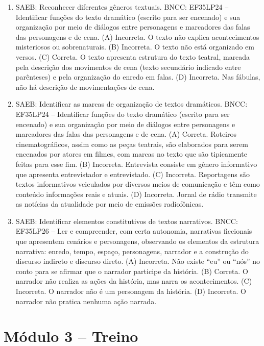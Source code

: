 \begin{enumerate}
\item
SAEB: Reconhecer diferentes gêneros textuais.
BNCC: EF35LP24 -- Identificar funções do texto dramático (escrito para ser
encenado) e sua organização por meio de diálogos entre personagens e
marcadores das falas das personagens e de cena.
(A) Incorreta. O texto não explica acontecimentos misteriosos ou
sobrenaturais.
(B) Incorreta. O texto não está organizado em versos.
(C) Correta. O texto apresenta estrutura do texto teatral, marcada pela
descrição dos movimentos de cena (texto secundário indicado entre
parênteses) e pela organização do enredo em falas.
(D) Incorreta. Nas fábulas, não há descrição de movimentações de cena.

\item
SAEB: Identificar as marcas de organização de textos dramáticos.
BNCC: EF35LP24 -- Identificar funções do texto dramático (escrito para
ser encenado) e sua organização por meio de diálogos entre personagens e
marcadores das falas das personagens e de cena.
(A) Correta. Roteiros cinematográficos, assim como as peças teatrais,
são elaborados para serem encenados por atores em filmes, com marcas
no texto que são tipicamente feitas para esse fim.
(B) Incorreta. Entrevista consiste em gênero informativo que apresenta
entrevistador e entrevistado.
(C) Incorreta. Reportagens são textos informativos veiculados por
diversos meios de comunicação e têm como conteúdo informações reais e
atuais.
(D) Incorreta. Jornal de rádio transmite as notícias da atualidade por
meio de emissões radiofônicas.

\item
SAEB: Identificar elementos constitutivos de textos narrativos.
BNCC: EF35LP26 -- Ler e compreender, com certa autonomia, narrativas
ficcionais que apresentem cenários e personagens, observando os
elementos da estrutura narrativa: enredo, tempo, espaço, personagens,
narrador e a construção do discurso indireto e discurso direto.
(A) Incorreta. Não existe ``eu'' ou ``nós'' no conto para se afirmar
que o narrador participe da história.
(B) Correta. O narrador não realiza as ações da história, mas narra os
acontecimentos.
(C) Incorreta. O narrador não é um personagem da história.
(D) Incorreta. O narrador não pratica nenhuma ação narrada.
\end{enumerate}

\section*{Módulo 3 – Treino}

